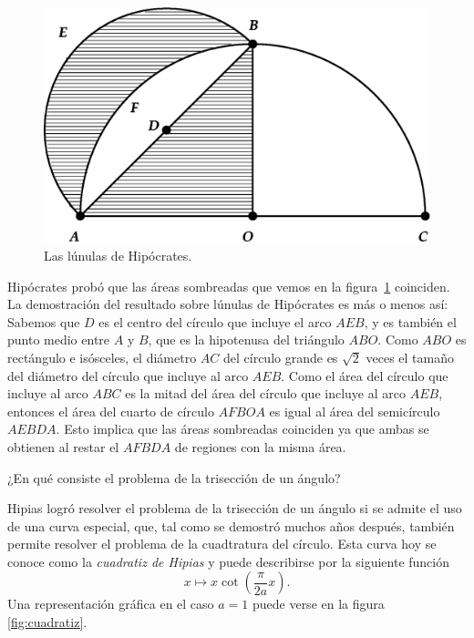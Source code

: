 \begin{figure}
   \centering
   \includegraphics[scale=0.3]{images/lunula}
   \caption{Las lúnulas de Hipócrates.}
   \label{fig:lunula}
\end{figure}

Hipócrates probó que las áreas
sombreadas que vemos en la figura~\ref{fig:lunula} coinciden. La demostración del
resultado sobre lúnulas de Hipócrates es más o menos así: Sabemos que $D$ es el
centro del círculo que incluye el arco $AEB$, y es también el punto medio entre $A$
y $B$, que es la hipotenusa del triángulo $ABO$. Como $ABO$ es rectángulo e
isósceles, el diámetro $AC$ del círculo grande es $\sqrt{2}$ veces el tamaño del
diámetro del círculo que incluye al arco $AEB$. Como el área del círculo que
incluye al arco $ABC$ es la mitad del área del círculo que incluye al arco $AEB$,
entonces el área del cuarto de círculo $AFBOA$ es igual al área del semicírculo
$AEBDA$. Esto implica que las áreas sombreadas coinciden ya que ambas se obtienen
al restar el $AFBDA$ de regiones con la misma área. 


\begin{exercise}
	¿En qué consiste el problema de la trisección de un ángulo?
\end{exercise}

Hipias logró resolver el problema de la trisección de un ángulo si se admite el
uso de una curva especial, que, tal como se demostró muchos años después, 
también permite
resolver el problema de la cuadtratura del círculo. Esta curva hoy se conoce
como la \emph{cuadratiz de Hipias} y puede describirse por la siguiente
función
\[
x\mapsto x\cot\left(\frac{\pi}{2a}x\right).
\]
Una representación gráfica en el caso $a=1$ puede verse en 
la figura \ref{fig:cuadratiz}.

